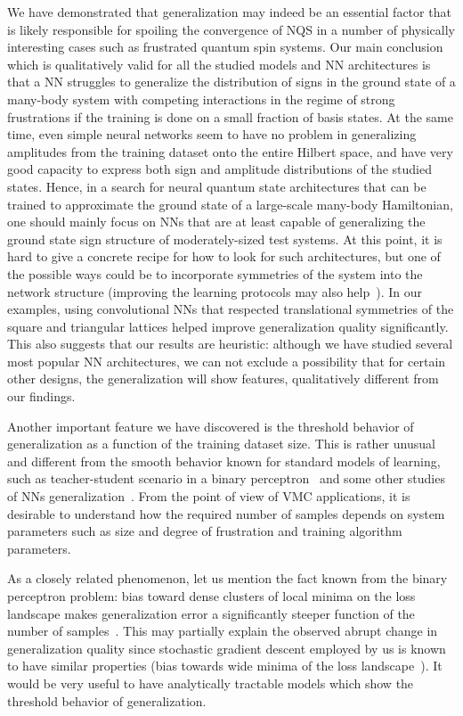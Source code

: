 We have demonstrated that generalization may indeed be an essential factor that is likely responsible for spoiling the convergence of NQS in a number of physically interesting cases such as frustrated quantum spin systems. Our main conclusion which is qualitatively valid for all the studied models and NN architectures is that a NN struggles to generalize the distribution of signs in the ground state of a many-body system with competing interactions in the regime of strong frustrations if the training is done on a small fraction of basis states. At the same time, even simple neural networks seem to have no problem in generalizing amplitudes from the training dataset onto the entire Hilbert space, and have very good capacity to express both sign and amplitude distributions of the studied states. Hence, in a search for neural quantum state architectures that can be trained to approximate the ground state of a large-scale many-body Hamiltonian, one should mainly focus on NNs that are at least capable of generalizing the ground state sign structure of moderately-sized test systems. At this point, it is hard to give a concrete recipe for how to look for such architectures, but one of the possible ways could be to incorporate symmetries of the system into the network structure (improving the learning protocols may also help~\cite{zen2019transfer}). In our examples, using convolutional NNs that respected translational symmetries of the square and triangular lattices helped improve generalization quality significantly. This also suggests that our results are heuristic: although we have studied several most popular NN architectures,  we can not exclude a possibility that for certain other designs, the generalization will show features, qualitatively different from our findings.

Another important feature we have discovered is the threshold behavior of generalization as a function of the training dataset size. This is rather unusual and different from the smooth behavior known for standard models of learning, such as teacher-student scenario in a binary perceptron~\cite{sompolinsky1990learning,seung1992statistical} and some other studies of NNs generalization~\cite{langford2002not}. From the point of view of VMC applications, it is desirable to understand how the required number of samples depends on system parameters such as size and degree of frustration and training algorithm parameters.

As a closely related phenomenon, let us mention the fact known from the binary perceptron problem: bias toward dense clusters of local minima on the loss landscape makes generalization error a significantly steeper function of the number of samples~\cite{baldassi2015subdominant}. This may partially explain the observed abrupt change in generalization quality since stochastic gradient descent employed by us is known to have similar properties (bias towards wide minima of the loss landscape~\cite{dziugaite2017computing,neyshabur2017exploring,li2018visualizing}). It would be very useful to have analytically tractable models which show the threshold behavior of generalization.

